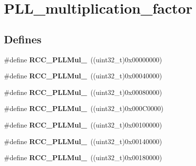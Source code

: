 \hypertarget{group__PLL__multiplication__factor}{
\section{PLL\_\-multiplication\_\-factor}
\label{group__PLL__multiplication__factor}
}
\subsection*{Defines}
\begin{DoxyCompactItemize}
\item 
\hypertarget{group__PLL__multiplication__factor_ga91b3b28fa4d56693d1eb361e24f317af}{
\#define {\bfseries RCC\_\-PLLMul\_}~((uint32\_\-t)0x00000000)}
\label{group__PLL__multiplication__factor_ga91b3b28fa4d56693d1eb361e24f317af}

\item 
\hypertarget{group__PLL__multiplication__factor_gafc2dd6c503b9ee6e0cfbec6d7d3a3e00}{
\#define {\bfseries RCC\_\-PLLMul\_}~((uint32\_\-t)0x00040000)}
\label{group__PLL__multiplication__factor_gafc2dd6c503b9ee6e0cfbec6d7d3a3e00}

\item 
\hypertarget{group__PLL__multiplication__factor_ga897be2cbbdabb6035bfe9bd515d6897f}{
\#define {\bfseries RCC\_\-PLLMul\_}~((uint32\_\-t)0x00080000)}
\label{group__PLL__multiplication__factor_ga897be2cbbdabb6035bfe9bd515d6897f}

\item 
\hypertarget{group__PLL__multiplication__factor_gad45e4f8edbbf4d49ded913e83e3a2d06}{
\#define {\bfseries RCC\_\-PLLMul\_}~((uint32\_\-t)0x000C0000)}
\label{group__PLL__multiplication__factor_gad45e4f8edbbf4d49ded913e83e3a2d06}

\item 
\hypertarget{group__PLL__multiplication__factor_ga2eea74b9955e556b302f4d446dd68eb4}{
\#define {\bfseries RCC\_\-PLLMul\_}~((uint32\_\-t)0x00100000)}
\label{group__PLL__multiplication__factor_ga2eea74b9955e556b302f4d446dd68eb4}

\item 
\hypertarget{group__PLL__multiplication__factor_ga1c307e520d53fa21bc60efcb71c03e01}{
\#define {\bfseries RCC\_\-PLLMul\_}~((uint32\_\-t)0x00140000)}
\label{group__PLL__multiplication__factor_ga1c307e520d53fa21bc60efcb71c03e01}

\item 
\hypertarget{group__PLL__multiplication__factor_ga8c1f1c5fe591f062078acf603bfbfb06}{
\#define {\bfseries RCC\_\-PLLMul\_}~((uint32\_\-t)0x00180000)}
\label{group__PLL__multiplication__factor_ga8c1f1c5fe591f062078acf603bfbfb06}


\end{DoxyCompactItemize}
